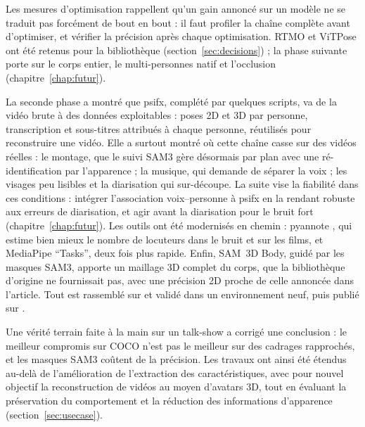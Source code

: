 \documentclass[11pt,a4paper]{report}
\newcommand{\code}[1]{\texttt{\detokenize{#1}}}
\begin{document}
Les mesures d'optimisation rappellent qu'un gain annoncé sur un modèle ne se traduit pas forcément de bout en
bout : il faut profiler la chaîne complète avant d'optimiser, et vérifier la précision après chaque optimisation.
RTMO et ViTPose ont été retenus pour la bibliothèque (section~\ref{sec:decisions}) ; la phase suivante porte sur le
corps entier, le multi-personnes natif et l'occlusion (chapitre~\ref{chap:futur}).

La seconde phase a montré que psifx, complété par quelques scripts, va de la vidéo brute à des données
exploitables : poses 2D et 3D par personne, transcription et sous-titres attribués à chaque personne, réutilisés pour
reconstruire une vidéo. Elle a surtout montré où cette chaîne casse sur des vidéos réelles : le montage, que le suivi
SAM3 gère désormais par plan avec une ré-identification par l'apparence ; la musique, qui demande de séparer la voix ;
les visages peu lisibles et la diarisation qui sur-découpe. La suite vise la fiabilité dans ces conditions : intégrer
l'association voix--personne à psifx en la rendant robuste aux erreurs de diarisation, et agir avant la diarisation
pour le bruit fort (chapitre~\ref{chap:futur}). Les outils ont été modernisés en chemin : pyannote \code{community-1},
qui estime bien mieux le nombre de locuteurs dans le bruit et sur les films, et MediaPipe \enquote{Tasks}, deux fois
plus rapide. Enfin, SAM~3D Body, guidé par les masques SAM3, apporte un maillage 3D complet du corps, que la
bibliothèque d'origine ne fournissait pas, avec une précision 2D proche de celle annoncée dans l'article. Tout est
rassemblé sur \code{dev} et validé dans un environnement neuf, puis publié sur \code{main}.

Une vérité terrain faite à la main sur un talk-show a corrigé une conclusion : le meilleur compromis sur COCO n'est pas le meilleur sur
des cadrages rapprochés, et les masques SAM3 coûtent de la précision. 
Les travaux ont ainsi été étendus au-delà de l'amélioration de l'extraction des caractéristiques, avec pour nouvel objectif la reconstruction 
de vidéos au moyen d'avatars 3D, tout en évaluant la préservation du comportement et la réduction des informations d'apparence (section~\ref{sec:usecase}).
\end{document}
